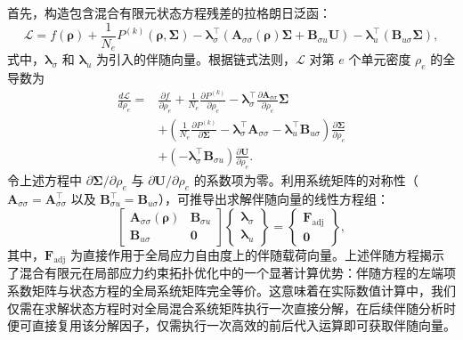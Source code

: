 首先，构造包含混合有限元状态方程残差的拉格朗日泛函：
\[
\mathcal{L} = f(\boldsymbol{\rho}) + \frac{1}{N_e} P^{(k)}(\boldsymbol{\rho}, \boldsymbol{\Sigma}) - \boldsymbol{\lambda}_\sigma^{\top} \left( \boldsymbol{A}_{\sigma\sigma}(\boldsymbol{\rho})\boldsymbol{\Sigma} + \boldsymbol{B}_{\sigma u}\boldsymbol{U} \right) - \boldsymbol{\lambda}_u^{\top} \left( \boldsymbol{B}_{u\sigma}\boldsymbol{\Sigma} \right),
\]
式中，$\boldsymbol{\lambda}_\sigma$ 和 $\boldsymbol{\lambda}_u$ 为引入的伴随向量。根据链式法则，$\mathcal{L}$ 对第 $e$ 个单元密度 $\rho_e$ 的全导数为
\[
\begin{aligned}
	\frac{d \mathcal{L}}{d \rho_e} =& \frac{\partial f}{\partial \rho_e} + \frac{1}{N_e} \frac{\partial P^{(k)}}{\partial \rho_e} - \boldsymbol{\lambda}_\sigma^{\top} \frac{\partial \boldsymbol{A}_{\sigma\sigma}}{\partial \rho_e} \boldsymbol{\Sigma} \\
	&+ \left( \frac{1}{N_e} \frac{\partial P^{(k)}}{\partial \boldsymbol{\Sigma}} - \boldsymbol{\lambda}_\sigma^{\top} \boldsymbol{A}_{\sigma\sigma} - \boldsymbol{\lambda}_u^{\top} \boldsymbol{B}_{u\sigma} \right) \frac{\partial \boldsymbol{\Sigma}}{\partial \rho_e} \\
	&+ \left( - \boldsymbol{\lambda}_\sigma^{\top} \boldsymbol{B}_{\sigma u} \right) \frac{\partial \boldsymbol{U}}{\partial \rho_e}.
\end{aligned}
\]
令上述方程中 $\partial \boldsymbol{\Sigma} / \partial \rho_e$ 与 $\partial \boldsymbol{U} / \partial \rho_e$ 的系数项为零。利用系统矩阵的对称性（$\boldsymbol{A}_{\sigma\sigma} = \boldsymbol{A}_{\sigma\sigma}^{\top}$ 以及 $\boldsymbol{B}_{\sigma u}^{\top} = \boldsymbol{B}_{u\sigma}$），可推导出求解伴随向量的线性方程组：
\begin{equation} \label{eq:ch5_hz_adjoint_equation}
	\begin{bmatrix}
		\boldsymbol{A}_{\sigma\sigma}(\boldsymbol{\rho}) & \boldsymbol{B}_{\sigma u}\\
		\boldsymbol{B}_{u\sigma} & \boldsymbol{0}
	\end{bmatrix}
	\begin{Bmatrix}
		\boldsymbol{\lambda}_\sigma\\
		\boldsymbol{\lambda}_u
	\end{Bmatrix} =  
	\begin{Bmatrix}
		\boldsymbol{F}_{\text{adj}} \\
		\boldsymbol{0}
	\end{Bmatrix},
\end{equation}
其中，$\boldsymbol{F}_{\text{adj}}$ 为直接作用于全局应力自由度上的伴随载荷向量。上述伴随方程揭示了混合有限元在局部应力约束拓扑优化中的一个显著计算优势：伴随方程的左端项系数矩阵与状态方程的全局系统矩阵完全等价。这意味着在实际数值计算中，我们仅需在求解状态方程时对全局混合系统矩阵执行一次直接分解，在后续伴随分析时便可直接复用该分解因子，仅需执行一次高效的前后代入运算即可获取伴随向量。

